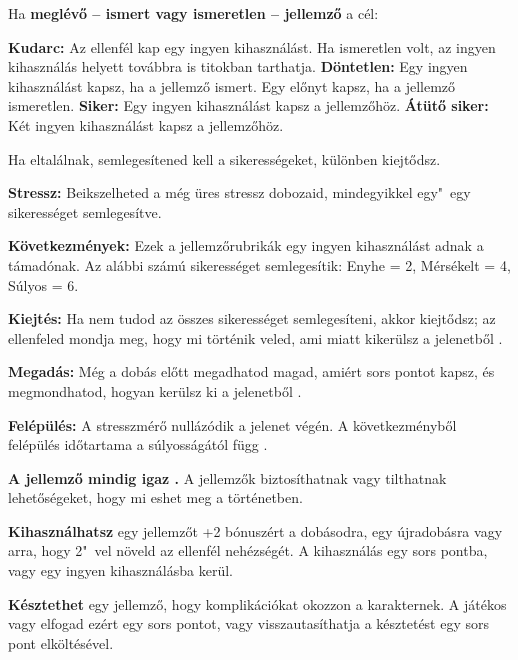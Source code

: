 \begin{multicols*}{2}
Ha \textbf{meglévő – ismert vagy ismeretlen – jellemző} a cél:

\begin{itemize}
    \failureitem \textbf{Kudarc:} Az ellenfél kap egy ingyen kihasználást. Ha ismeretlen volt, az ingyen kihasználás helyett továbbra is titokban tarthatja.
    \tieitem \textbf{Döntetlen:} Egy ingyen kihasználást kapsz, ha a jellemző ismert. Egy előnyt kapsz, ha a jellemző ismeretlen.
    \successitem \textbf{Siker:} Egy ingyen kihasználást kapsz a jellemzőhöz.
    \successwithstyleitem \textbf{Átütő siker:} Két ingyen kihasználást kapsz a jellemzőhöz.
\end{itemize}


Ha eltalálnak, semlegesítened kell a sikerességeket, különben kiejtődsz.

\textbf{Stressz:} Beikszelheted a még üres stressz dobozaid, mindegyikkel egy"~egy sikerességet semlegesítve.

\textbf{Következmények:} Ezek a jellemzőrubrikák egy ingyen kihasználást adnak a támadónak. Az alábbi számú sikerességet semlegesítik: Enyhe = 2, Mérsékelt = 4, Súlyos = 6.

\textbf{Kiejtés:} Ha nem tudod az összes sikerességet semlegesíteni, akkor kiejtődsz; az ellenfeled mondja meg, hogy mi történik veled, ami miatt kikerülsz a jelenetből .

\textbf{Megadás:} Még a dobás előtt megadhatod magad, amiért sors pontot kapsz, és megmondhatod, hogyan kerülsz ki a jelenetből .

\textbf{Felépülés:} A stresszmérő nullázódik a jelenet végén. A következményből felépülés időtartama a súlyosságától függ .


\textbf{A jellemző mindig igaz .} A jellemzők biztosíthatnak vagy tilthatnak lehetőségeket, hogy mi eshet meg a történetben.

\textbf{Kihasználhatsz } egy jellemzőt +2 bónuszért a dobásodra, egy újradobásra vagy arra, hogy 2"~vel növeld az ellenfél nehézségét. A kihasználás egy sors pontba, vagy egy ingyen kihasználásba kerül.

\textbf{Késztethet } egy jellemző, hogy komplikációkat okozzon a karakternek. A játékos vagy elfogad ezért egy sors pontot, vagy visszautasíthatja a késztetést egy sors pont elköltésével.

\end{multicols*}

